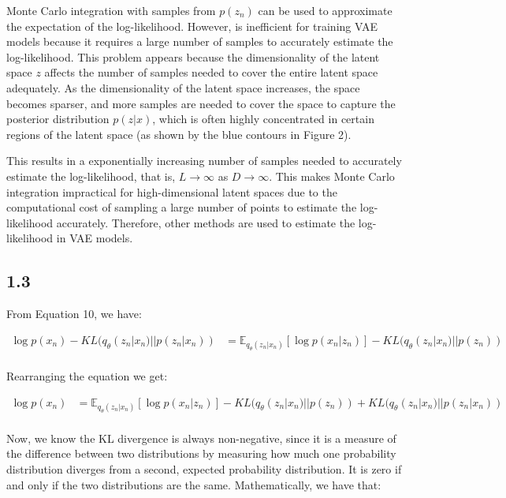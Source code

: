 \documentclass{article}
\begin{document}
Monte Carlo integration with samples from $p(z_n)$ can be used to approximate the expectation of the log-likelihood. 
However, is inefficient for training VAE models because it requires a large number of samples to accurately estimate the
log-likelihood. This problem appears because the dimensionality of the latent space $z$ affects the number of samples
needed to cover the entire latent space adequately. As the dimensionality of the latent space increases, the space
becomes sparser, and more samples are needed to cover the space to capture the posterior distribution $p(z|x)$, which
is often highly concentrated in certain regions of the latent space (as shown by the blue contours in Figure 2).

This results in a exponentially increasing number of samples needed to accurately estimate the log-likelihood, 
that is, $L \rightarrow \infty$ as $D \rightarrow \infty$. This makes Monte Carlo integration impractical for high-dimensional
latent spaces due to the computational cost of sampling a large number of points to estimate the log-likelihood accurately.
Therefore, other methods are used to estimate the log-likelihood in VAE models. 

\subsection*{1.3}

From Equation 10, we have:

\begin{align*}
    \log p(x_n) - KL(q_{\theta}(z_n|x_n) || p(z_n|x_n)) &= \mathbb{E}_{q_{\theta}(z_n|x_n)}[\log p(x_n|z_n)] - KL(q_{\theta}(z_n|x_n) || p(z_n)) \\
\end{align*}

Rearranging the equation we get: 

\begin{align*}
    \log p(x_n) &= \mathbb{E}_{q_{\theta}(z_n|x_n)}[\log p(x_n|z_n)] - KL(q_{\theta}(z_n|x_n) || p(z_n)) + KL(q_{\theta}(z_n|x_n) || p(z_n|x_n)) \\
\end{align*}

Now, we know the KL divergence is always non-negative, since it is a measure of the difference between two distributions by
measuring how much one probability distribution diverges from a second, expected probability distribution. It is zero if and only if the two distributions are the same.
Mathematically, we have that: 
\end{document}
